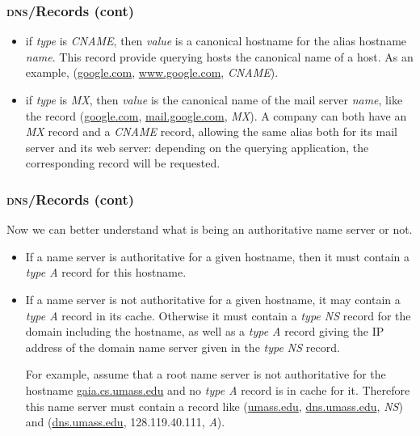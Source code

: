 %
\begin{frame}
\frametitle{\textsc{dns}/Records (cont)}

\begin{itemize}

  \item if \emph{type} is \emph{CNAME}, then \emph{value} is a
  canonical hostname for the alias hostname \emph{name}. This record
  provide querying hosts the canonical name of a host. As an example,
  (\url{google.com}, \url{www.google.com}, \emph{CNAME}).

  \item if \emph{type} is \emph{MX}, then \emph{value} is the
  canonical name of the mail server \emph{name}, like the record
  (\url{google.com}, \url{mail.google.com}, \emph{MX}). A company can
  both have an \emph{MX} record and a \emph{CNAME} record, allowing
  the same alias both for its mail server and its web server:
  depending on the querying application, the corresponding record will
  be requested.

\end{itemize}

\end{frame}

%
\begin{frame}
\frametitle{\textsc{dns}/Records (cont)}

Now we can better understand what is being an authoritative name
server or not.

\begin{itemize}

  \item If a name server is authoritative for a given hostname, then
  it must contain a \emph{type A} record for this hostname. 

  \item If a name server is not authoritative for a given hostname,
  it may contain a \emph{type A} record in its cache. Otherwise it
  must contain a \emph{type NS} record for the domain including the
  hostname, as well as a \emph{type A} record giving the IP address of
  the domain name server given in the \emph{type NS} record.

  For example, assume that a root name server is not authoritative for
  the hostname \url{gaia.cs.umass.edu} and no \emph{type A} record is
  in cache for it. Therefore this name server must contain a record
  like (\url{umass.edu}, \url{dns.umass.edu}, \emph{NS}) and
  (\url{dns.umass.edu}, 128.119.40.111, \emph{A}).

\end{itemize}


\end{frame}

